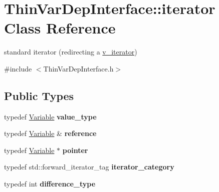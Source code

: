 \hypertarget{class_s_m_spp__di__unipi__it_1_1_thin_var_dep_interface_1_1iterator}{}\section{Thin\+Var\+Dep\+Interface\+:\+:iterator Class Reference}
\label{class_s_m_spp__di__unipi__it_1_1_thin_var_dep_interface_1_1iterator}


standard iterator (redirecting a \mbox{\hyperlink{class_s_m_spp__di__unipi__it_1_1_thin_var_dep_interface_1_1v__iterator}{v\+\_\+iterator}})  




{\ttfamily \#include $<$Thin\+Var\+Dep\+Interface.\+h$>$}

\subsection*{Public Types}
\begin{DoxyCompactItemize}
\item 
typedef \mbox{\hyperlink{class_s_m_spp__di__unipi__it_1_1_variable}{Variable}} {\bfseries value\+\_\+type}
\item 
typedef \mbox{\hyperlink{class_s_m_spp__di__unipi__it_1_1_variable}{Variable}} \& {\bfseries reference}
\item 
typedef \mbox{\hyperlink{class_s_m_spp__di__unipi__it_1_1_variable}{Variable}} $\ast$ {\bfseries pointer}
\item 
typedef std\+::forward\+\_\+iterator\+\_\+tag {\bfseries iterator\+\_\+category}
\item 
typedef int {\bfseries difference\+\_\+type}
\end{DoxyCompactItemize}
